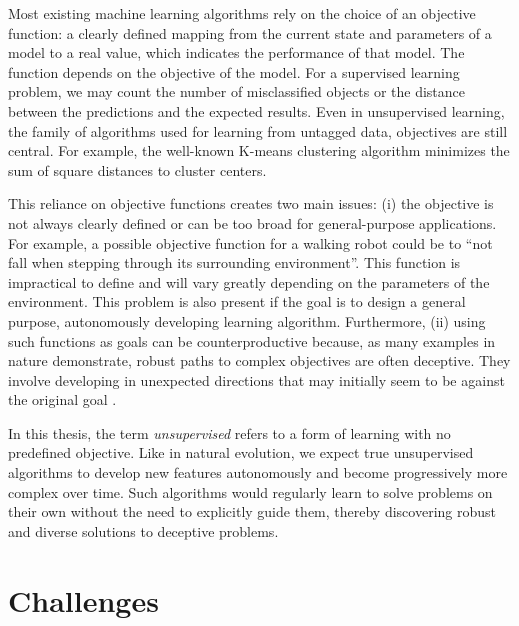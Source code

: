 Most existing machine learning algorithms rely on the choice of an objective
function: a clearly defined mapping from the current state and parameters of a
model to a real value, which indicates the performance of that model. The
function depends on the objective of the model. For a supervised learning
problem, we may count the number of misclassified objects or the distance
between the predictions and the expected results. Even in unsupervised learning,
the family of algorithms used for learning from untagged data, objectives are
still central. For example, the well-known K-means clustering algorithm minimizes
the sum of square distances to cluster centers.

This reliance on objective functions creates two main issues: (i) the objective
is not always clearly defined or can be too broad for general-purpose
applications. For example, a possible objective function for a walking robot
could be to ``not fall when stepping through its surrounding environment''. This
function is impractical to define and will vary greatly depending on the
parameters of the environment. This problem is also present if the goal is to
design a general purpose, autonomously developing learning algorithm.
Furthermore, (ii) using such functions as goals can be counterproductive
because, as many examples in nature demonstrate, robust paths to complex
objectives are often deceptive. They involve developing in unexpected directions
that may initially seem to be against the original goal
\parencite{stanleyWhyGreatnessCannot2015}.

In this thesis, the term \emph{unsupervised} refers to a form of learning with
no predefined objective. Like in natural evolution, we expect true unsupervised
algorithms to develop new features autonomously and become progressively more
complex over time. Such algorithms would regularly learn to solve problems on
their own without the need to explicitly guide them, thereby discovering robust
and diverse solutions to deceptive problems.


\section{Challenges}\label{sec:challenges}


